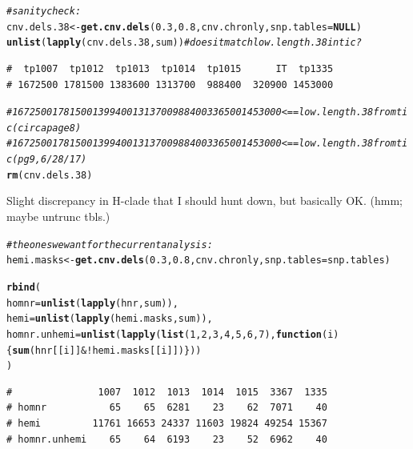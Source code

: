\documentclass{article}\usepackage[]{graphicx}\usepackage[]{color}
\makeatletter
\newcommand{\hlnum}[1]{\textcolor[rgb]{0.686,0.059,0.569}{#1}}%
\newcommand{\hlcom}[1]{\textcolor[rgb]{0.678,0.584,0.686}{\textit{#1}}}%
\newcommand{\hlopt}[1]{\textcolor[rgb]{0,0,0}{#1}}%
\newcommand{\hlstd}[1]{\textcolor[rgb]{0.345,0.345,0.345}{#1}}%
\newcommand{\hlkwa}[1]{\textcolor[rgb]{0.161,0.373,0.58}{\textbf{#1}}}%
\newcommand{\hlkwb}[1]{\textcolor[rgb]{0.69,0.353,0.396}{#1}}%
\newcommand{\hlkwc}[1]{\textcolor[rgb]{0.333,0.667,0.333}{#1}}%
\newcommand{\hlkwd}[1]{\textcolor[rgb]{0.737,0.353,0.396}{\textbf{#1}}}%
\newenvironment{kframe}{%
 \def\at@end@of@kframe{}%
 \ifinner\ifhmode%
  \def\at@end@of@kframe{\end{minipage}}%
  \begin{minipage}{\columnwidth}%
 \fi\fi%
 \def\FrameCommand##1{\hskip\@totalleftmargin \hskip-\fboxsep
 \colorbox{shadecolor}{##1}\hskip-\fboxsep
     \hskip-\linewidth \hskip-\@totalleftmargin \hskip\columnwidth}%
 \MakeFramed {\advance\hsize-\width
   \@totalleftmargin\z@ \linewidth\hsize
   \@setminipage}}%
 {\par\unskip\endMakeFramed%
 \at@end@of@kframe}
\newenvironment{knitrout}{}{} %
\makeatother
\begin{document}
\begin{knitrout}
\begin{kframe}
\begin{alltt}
\hlcom{# sanity check:}
\hlstd{cnv.dels.38} \hlkwb{<-} \hlkwd{get.cnv.dels}\hlstd{(}\hlnum{0.3}\hlstd{,} \hlnum{0.8}\hlstd{, cnv.chronly,} \hlkwc{snp.tables} \hlstd{=} \hlkwa{NULL}\hlstd{)}
\hlkwd{unlist}\hlstd{(}\hlkwd{lapply}\hlstd{(cnv.dels.38,sum))} \hlcom{# does it match low.length.38 in tic ?}
\end{alltt}
\begin{verbatim}
#  tp1007  tp1012  tp1013  tp1014  tp1015      IT  tp1335 
# 1672500 1781500 1383600 1313700  988400  320900 1453000
\end{verbatim}
\begin{alltt}
\hlcom{# 1672500 1781500 1399400 1313700 988400 336500 1453000 <== low.length.38 from tic (circa page 8)}
\hlcom{# 1672500 1781500 1399400 1313700 988400 336500 1453000 <== low.length.38 from tic (pg9, 6/28/17)}
\hlkwd{rm}\hlstd{(cnv.dels.38)}
\end{alltt}
\end{kframe}
\end{knitrout}

Slight discrepancy in H-clade that I should hunt down, but basically OK. (hmm; maybe untrunc tbls.)

\begin{knitrout}\footnotesize
{}\color{fgcolor}\begin{kframe}
\begin{alltt}
\hlcom{# the ones we want for the current analysis:}
\hlstd{hemi.masks} \hlkwb{<-} \hlkwd{get.cnv.dels}\hlstd{(}\hlnum{0.3}\hlstd{,} \hlnum{0.8}\hlstd{, cnv.chronly,} \hlkwc{snp.tables}\hlstd{=snp.tables)}

\hlkwd{rbind}\hlstd{(}
  \hlkwc{homnr}        \hlstd{=} \hlkwd{unlist}\hlstd{(}\hlkwd{lapply}\hlstd{(hnr,sum)),}
  \hlkwc{hemi}         \hlstd{=} \hlkwd{unlist}\hlstd{(}\hlkwd{lapply}\hlstd{(hemi.masks, sum)),}
  \hlkwc{homnr.unhemi} \hlstd{=} \hlkwd{unlist}\hlstd{(}\hlkwd{lapply}\hlstd{(}\hlkwd{list}\hlstd{(}\hlnum{1}\hlstd{,}\hlnum{2}\hlstd{,}\hlnum{3}\hlstd{,}\hlnum{4}\hlstd{,}\hlnum{5}\hlstd{,}\hlnum{6}\hlstd{,}\hlnum{7}\hlstd{),} \hlkwa{function}\hlstd{(}\hlkwc{i}\hlstd{)\{}\hlkwd{sum}\hlstd{(hnr[[i]]} \hlopt{& !}\hlstd{hemi.masks[[i]])\}))}
\hlstd{)}
\end{alltt}
\begin{verbatim}
#               1007  1012  1013  1014  1015  3367  1335
# homnr           65    65  6281    23    62  7071    40
# hemi         11761 16653 24337 11603 19824 49254 15367
# homnr.unhemi    65    64  6193    23    52  6962    40
\end{verbatim}
\end{kframe}
\end{knitrout}
\end{document}
